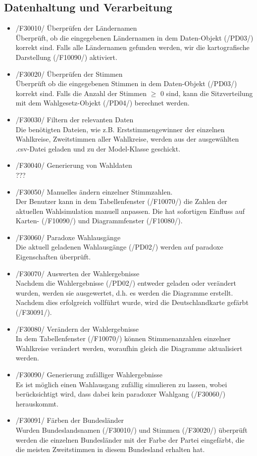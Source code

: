 \documentclass[10pt,a4paper]{article}
\begin{document}
\subsection{Datenhaltung und Verarbeitung}
\begin{itemize}
	\item /F30010/ Überprüfen der Ländernamen \hfill \\
	Überprüft, ob die eingegebenen Ländernamen in dem Daten-Objekt (/PD03/) korrekt sind. Falls alle Ländernamen gefunden werden, wir die kartografische Darstellung (/F10090/) aktiviert.
	\item /F30020/ Überprüfen der Stimmen\hfill \\
	Überprüft ob die eingegebenen Stimmen in dem Daten-Objekt (/PD03/) korrekt sind. Falls die Anzahl der Stimmen $\geq$ 0 sind, kann die Sitzverteilung mit dem Wahlgesetz-Objekt (/PD04/) berechnet werden.
	\item /F30030/ Filtern der relevanten Daten \hfill \\
	Die benötigten Dateien, wie z.B. Erststimmengewinner der einzelnen Wahlkreise, Zweitstimmen aller Wahlkreise, werden aus der ausgewählten .csv-Datei geladen und zu der Model-Klasse geschickt.			
	\item /F30040/ Generierung von Wahldaten \hfill \\
	???
	\item /F30050/ Manuelles ändern einzelner Stimmzahlen. \hfill \\
	Der Benutzer kann in dem Tabellenfenster (/F10070/) die Zahlen der aktuellen Wahlsimulation manuell anpassen.
	Die hat sofortigen Einfluss auf Karten- (/F10090/) und Diagrammfenster (/F10080/).
	\item /F30060/ Paradoxe Wahlausgänge \hfill \\
	Die aktuell geladenen Wahlausgänge (/PD02/) werden auf paradoxe Eigenschaften überprüft.
	\item /F30070/ Auswerten der Wahlergebnisse \hfill \\
	Nachdem die Wahlergebnisse (/PD02/) entweder geladen oder verändert wurden, werden sie ausgewertet, d.h. es werden die Diagramme erstellt. Nachdem dies erfolgreich vollführt wurde, wird die Deutschlandkarte gefärbt (/F30091/). 
	\item /F30080/ Verändern der Wahlergebnisse \hfill \\
	In dem Tabellenfenster (/F10070/) können Stimmenanzahlen einzelner Wahlkreise verändert werden, woraufhin gleich die Diagramme aktualisiert werden.
	\item /F30090/ Generierung zufälliger Wahlergebnisse \hfill \\
	Es ist möglich einen Wahlausgang zufällig simulieren zu lassen, wobei berücksichtigt wird, dass dabei kein paradoxer Wahlgang (/F30060/) herauskommt.
	\item /F30091/ Färben der Bundesländer \hfill \\
	Wurden Bundeslandsnamen (/F30010/) und Stimmen (/F30020/) überprüft werden die einzelnen Bundesländer mit der Farbe der Partei eingefärbt, die die meisten Zweitstimmen in diesem Bundesland erhalten hat.
	
\end{itemize}
\end{document}
